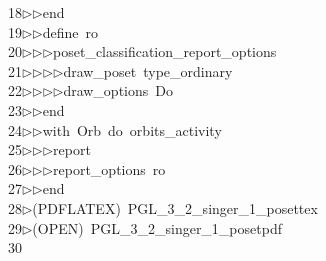 \begin{tabbing}
18\>$\triangleright$\>$\triangleright$\>end\ \\[0pt]
19\>$\triangleright$\>$\triangleright$\>define\ ro\ \\[0pt]
20\>$\triangleright$\>$\triangleright$\>$\triangleright$\>poset\_classification\_report\_options\ \\[0pt]
21\>$\triangleright$\>$\triangleright$\>$\triangleright$\>$\triangleright$\>draw\_poset\ type\_ordinary\ \\[0pt]
22\>$\triangleright$\>$\triangleright$\>$\triangleright$\>$\triangleright$\>draw\_options\ Do\ \\[0pt]
23\>$\triangleright$\>$\triangleright$\>end\ \\[0pt]
24\>$\triangleright$\>$\triangleright$\>with\ Orb\ do\ orbits\_activity\ \\[0pt]
25\>$\triangleright$\>$\triangleright$\>$\triangleright$\>report\ \ \\[0pt]
26\>$\triangleright$\>$\triangleright$\>$\triangleright$\>report\_options\ ro\ \\[0pt]
27\>$\triangleright$\>$\triangleright$\>end\ \\[0pt]
28\>$\triangleright$\>(PDFLATEX)\ PGL\_3\_2\_singer\_1\_posettex\\[0pt]
29\>$\triangleright$\>(OPEN)\ PGL\_3\_2\_singer\_1\_posetpdf\\[0pt]
30\>\end{tabbing}
